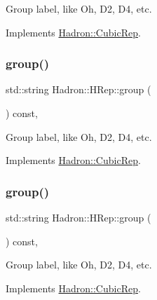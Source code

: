 Group label, like Oh, D2, D4, etc. 

Implements \mbox{\hyperlink{structHadron_1_1CubicRep_a0748f11ec87f387062c8e8981339a29c}{Hadron\+::\+Cubic\+Rep}}.

\mbox{\label{structHadron_1_1HRep_afba35b8c5ac09db6b62284283ef291f6}} 
\subsubsection{\texorpdfstring{group()}{group()}\hspace{0.1cm}{\footnotesize\ttfamily [2/3]}}
{\footnotesize\ttfamily std\+::string Hadron\+::\+H\+Rep\+::group (\begin{DoxyParamCaption}{ }\end{DoxyParamCaption}) const\hspace{0.3cm}{\ttfamily [inline]}, {\ttfamily [virtual]}}

Group label, like Oh, D2, D4, etc. 

Implements \mbox{\hyperlink{structHadron_1_1CubicRep_a0748f11ec87f387062c8e8981339a29c}{Hadron\+::\+Cubic\+Rep}}.

\mbox{\label{structHadron_1_1HRep_afba35b8c5ac09db6b62284283ef291f6}} 
\subsubsection{\texorpdfstring{group()}{group()}\hspace{0.1cm}{\footnotesize\ttfamily [3/3]}}
{\footnotesize\ttfamily std\+::string Hadron\+::\+H\+Rep\+::group (\begin{DoxyParamCaption}{ }\end{DoxyParamCaption}) const\hspace{0.3cm}{\ttfamily [inline]}, {\ttfamily [virtual]}}

Group label, like Oh, D2, D4, etc. 

Implements \mbox{\hyperlink{structHadron_1_1CubicRep_a0748f11ec87f387062c8e8981339a29c}{Hadron\+::\+Cubic\+Rep}}.

\mbox{\label{structHadron_1_1HRep_aa90a43bdbf19213e75180e0457ae36d0}} 
